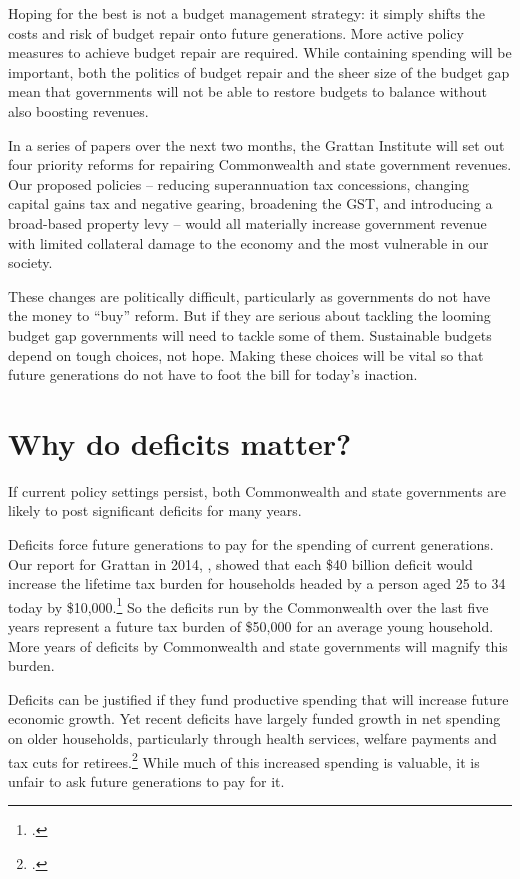 \documentclass[twoside,english]{palatinob5ona4portrait}
\begin{document}
\begin{overview}[-40pt]
Hoping for the best is not a budget management strategy: it simply shifts the costs and risk of budget repair onto future generations. More active policy measures to achieve budget repair are required. While containing spending will be important, both the politics of budget repair and the sheer size of the budget gap mean that governments will not be able to restore budgets to balance without also boosting revenues.

In a series of papers over the next two months, the Grattan Institute will set out four priority reforms for repairing Commonwealth and state government revenues. Our proposed policies – reducing superannuation tax concessions, changing capital gains tax and negative gearing, broadening the GST, and introducing a broad-based property levy – would all materially increase government revenue with limited collateral damage to the economy and the most vulnerable in our society.

These changes are politically difficult, particularly as governments do not have the money to “buy” reform. But if they are serious about tackling the looming budget gap governments will need to tackle some of them. Sustainable budgets depend on tough choices, not hope. Making these choices will be vital so that future generations do not have to foot the bill for today’s inaction.

\end{overview}
\makeatletter\@openrightfalse
\cleardoubleevenstandardpage
\chapter{Why do deficits matter?}\label{chapter:FISCAL-1}
If current policy settings persist, both Commonwealth and state governments are likely to post significant deficits for many years. 

Deficits force future generations to pay for the spending of current generations. Our report for Grattan in 2014, , showed that each \$40 billion deficit would increase the lifetime tax burden for households headed by a person aged 25 to 34 today by \$10,000.\footcite[][9]{DaleyWoodWeidmannEtAl2014} So the deficits run by the Commonwealth over the last five years represent a future tax burden of \$50,000 for an average young household. More years of deficits by Commonwealth and state governments will magnify this burden. 

Deficits can be justified if they fund productive spending that will increase future economic growth. Yet recent deficits have largely funded growth in net spending on older households, particularly through health services, welfare payments and tax cuts for retirees.\footcite[][9]{DaleyWoodWeidmannEtAl2014}  While much of this increased spending is valuable, it is unfair to ask future generations to pay for it. 
\end{document}
